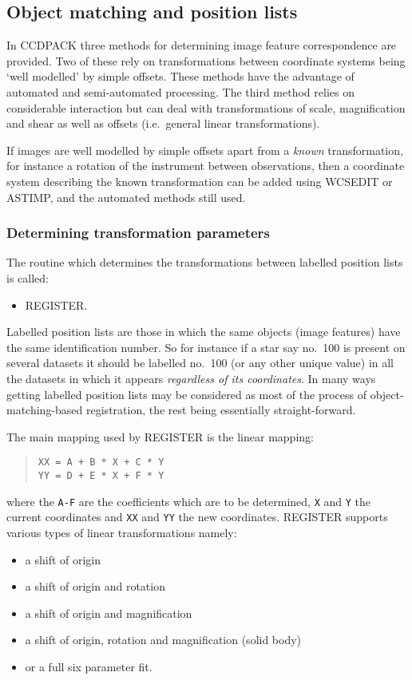 \documentclass[twoside,11pt]{article}
\newcommand{\htmlref}[2]{#1}
\newcommand{\xlabel}[1]{}
\renewcommand{\_}{\texttt{\symbol{95}}}
\newenvironment{myquote}{\begin{quote}\begin{small}}{\end{small}\end{quote}}
\newcommand{\text}[1]{{\small \tt #1}}
\newcommand{\routine}[1]{{\sc #1}}
\newcommand{\xroutine}[1]{\htmlref{{\sc #1}}{#1}}
\begin{document}
\subsection{\xlabel{objectmatching}\label{object_matching}Object matching 
            and position lists}

In CCDPACK three methods for determining image feature correspondence
are provided. Two of these rely on transformations between 
coordinate systems being
`well modelled' by simple offsets. These methods have the advantage of
automated and semi-automated processing. The third method relies on
considerable interaction but can deal with transformations of scale,
magnification and shear as well as offsets (i.e.\ general linear
transformations).

If images are well modelled by simple offsets apart from a 
{\em known} transformation, for instance a rotation of the
instrument between observations, then a coordinate system 
describing the known
transformation can be added using \xroutine{WCSEDIT} or \xroutine{ASTIMP},
and the automated methods still used.


\subsubsection{\xlabel{registration}Determining transformation parameters}

The routine which determines the transformations between labelled
position lists is called:
\begin{itemize}
\item \xroutine{REGISTER}.
\end{itemize}
Labelled position lists are those in which the same objects (image
features) have the same identification number. So for instance if a
star say no.\ 100 is present on several datasets it should be labelled
no.\ 100 (or any other unique value) in all the datasets in which it
appears {\em regardless of its coordinates}. In many ways getting
labelled position lists may be considered as most of the process of
object-matching-based registration, 
the rest being essentially straight-forward.

The main mapping used by \routine{REGISTER} is the linear mapping:
\begin{myquote}
\begin{verbatim}
XX = A + B * X + C * Y
YY = D + E * X + F * Y
\end{verbatim}
\end{myquote}
where the \text{A-F} are the coefficients which are to be
determined, \text{X} and \text{Y} the current coordinates and
\text{XX} and \text{YY} the new coordinates. \routine{REGISTER} supports
various types of linear transformations namely:
\begin{itemize}
\item a shift of origin
\item a shift of origin and rotation
\item a shift of origin and magnification
\item a shift of origin, rotation and magnification (solid body)
\item or a full six parameter fit.
\end{itemize}
\end{document}
